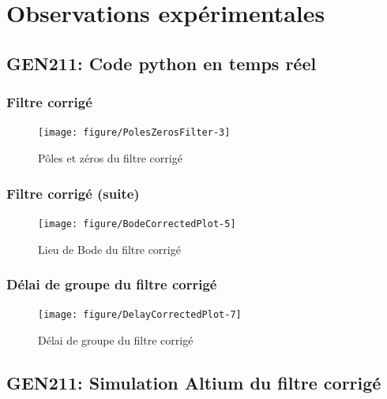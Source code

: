 \documentclass[10pt]{beamer}\usepackage[]{graphicx}\usepackage[]{xcolor}
\newenvironment{knitrout}{}{} %
\begin{document}
\section{Observations expérimentales}

\subsection{GEN211: Code python en temps réel}


\begin{frame}
\frametitle{Filtre corrigé}
\begin{figure}
\centering
\begin{knitrout}\footnotesize
{}\color{fgcolor}
\texttt{[image: figure/PolesZerosFilter-3]} 
\end{knitrout}
\caption{Pôles et zéros du filtre corrigé}
\label{fig:poles-zeros-filter}
\end{figure}
\end{frame}

\begin{frame}
\frametitle{Filtre corrigé (suite)}
\begin{figure}
\centering
\begin{knitrout}\footnotesize
{}\color{fgcolor}
\texttt{[image: figure/BodeCorrectedPlot-5]} 
\end{knitrout}
\caption{Lieu de Bode du filtre corrigé}
\label{fig:bode-filter}
\end{figure}
\end{frame}

\begin{frame}
\frametitle{Délai de groupe du filtre corrigé}
\begin{figure}
\centering
\begin{knitrout}\footnotesize
{}\color{fgcolor}
\texttt{[image: figure/DelayCorrectedPlot-7]} 
\end{knitrout}
\caption{Délai de groupe du filtre corrigé}
\label{fig:delay-corrected}
\end{figure}
\end{frame}

\subsection{GEN211: Simulation Altium du filtre corrigé}
\end{document}
